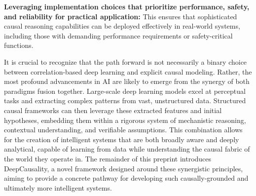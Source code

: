     \textbf{Leveraging implementation choices that prioritize performance, safety, and reliability for practical application:} This ensures that sophisticated causal reasoning capabilities can be deployed effectively in real-world systems, including those with demanding performance requirements or safety-critical functions.

It is crucial to recognize that the path forward is not necessarily a binary choice between correlation-based deep learning and explicit causal modeling. Rather, the most profound advancements in AI are likely to emerge from the synergy of both paradigms fusion together. Large-scale deep learning models excel at perceptual tasks and extracting complex patterns from vast, unstructured data. Structured causal frameworks can then leverage these extracted features and initial hypotheses, embedding them within a rigorous system of mechanistic reasoning, contextual understanding, and verifiable assumptions. This combination allows for the creation of intelligent systems that are both broadly aware and deeply analytical, capable of learning from data while understanding the causal fabric of the world they operate in. The remainder of this preprint introduces DeepCausality, a novel framework designed around these synergistic principles, aiming to provide a concrete pathway for developing such causally-grounded and ultimately more intelligent systems.